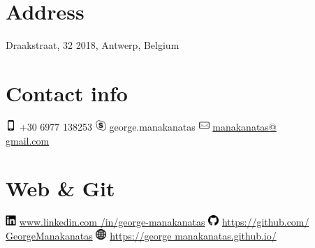 \documentclass[]{friggeri-cv}
\begin{document}


\begin{aside}
  \section{Address}
    Draakstraat, 32
    2018, Antwerp, Belgium
  \section{Contact info}
    \includegraphics[width=0.4cm]{img/phone.png} +30 6977 138253
    \includegraphics[width=0.4cm]{img/skype.png} george.manakanatas
    \includegraphics[width=0.4cm]{img/mail.png} \hspace{0.5 mm} \href{mailto:manakanatas@gmail.com}{manakanatas@\\gmail.com}   
  \section{Web \& Git}
    \includegraphics[width=0.4cm]{img/Linkedin.png} \hspace{0.5 mm} \href{http://www.linkedin.com/in/george-manakanatas}{www.linkedin.com /in/george-manakanatas}
    \includegraphics[width=0.4cm]{img/github.png} \hspace{0.5 mm} \href{https://github.com/GeorgeManakanatas}{https://github.com/ GeorgeManakanatas}
    \includegraphics[width=0.4cm]{img/web.png} \hspace{0.5 mm} \href{https://georgemanakanatas.github.io/}{https://george manakanatas.github.io/}

\end{aside}
\end{document}
